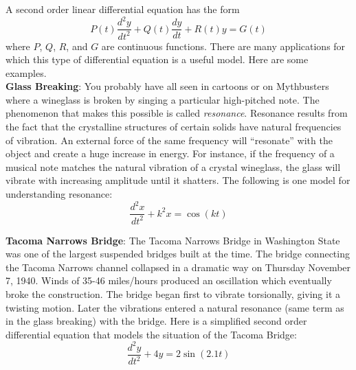 \pagestyle{fancy}
\renewcommand{\theUnit}{2.2}
\ifthenelse{\isundefined{\UnitPageNumbers}}{}{\setcounter{page}{1}}
\rhead{Section \theUnit: Second Order Linear DEs}
\rfoot{\mypage}
\lfoot{}
\cfoot{}
\renewcommand{\footrulewidth}{.4pt}
\vspace*{-20pt} \thispagestyle{firstfooter}

A second order linear differential equation has the form
\[
P(t)\frac{d^2y}{dt^2}+Q(t)\frac{dy}{dt}+R(t)y=G(t)
\]
where $P$, $Q$, $R$, and $G$ are continuous functions. There are many applications for which this type of differential equation is a useful model. %
Here are some examples. \\

\textbf{Glass Breaking}: You probably have all seen in cartoons or on Mythbusters where a wineglass is broken by singing a particular high-pitched note. The phenomenon that makes this possible is called \textit{resonance}. Resonance results from the fact that the crystalline structures of certain solids have natural frequencies of vibration. An external force of the same frequency will ``resonate'' with the object and create a huge increase in energy. For instance, if the frequency of a musical note matches the natural vibration of a crystal wineglass, the glass will vibrate with increasing amplitude until it shatters. The following is one model for understanding resonance: 
\[
\frac{d^2x}{dt^2}+k^2x=\cos(kt)
\]

\textbf{Tacoma Narrows Bridge}: The Tacoma Narrows Bridge in Washington State was one of the largest suspended bridges built at the time. The bridge connecting the Tacoma Narrows channel collapsed in a dramatic way on Thursday November 7, 1940. Winds of 35-46 miles/hours produced an oscillation which eventually broke the construction. The bridge began first to vibrate torsionally, giving it a twisting motion. Later the vibrations entered a natural resonance (same term as in the glass breaking) with the bridge. Here is a simplified second order differential equation that models the situation of the Tacoma Bridge:
\[
\frac{d^2y}{dt^2}+4y=2\sin(2.1t)
\]


